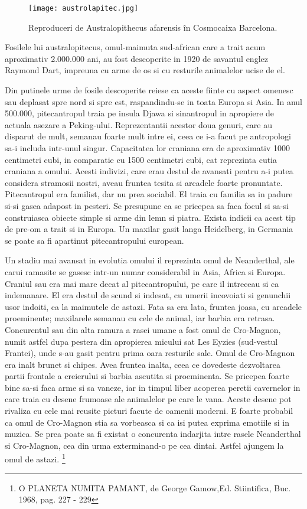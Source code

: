 \begin{wrapfigure}[24]{r}{0.3\linewidth} 
    \texttt{[image: austrolapitec.jpg]}
    \caption{Reproduceri de Australopithecus afarensis în Cosmocaixa Barcelona.}
    \label{fig:pca}
\end{wrapfigure}
Fosilele lui australopitecus, omul-maimuta sud-african care a trait acum aproximativ 2.000.000 ani, au fost descoperite in 1920 de savantul englez Raymond Dart, impreuna cu arme de os si cu resturile animalelor ucise de el.

Din putinele urme de fosile descoperite reiese ca aceste fiinte cu aspect omenesc sau deplasat spre nord si spre est, raspandindu-se in toata Europa si Asia. In anul 500.000, pitecantropul traia pe insula Djawa si sinantropul in apropiere de actuala asezare a Peking-ului. Reprezentantii acestor doua genuri, care au disparut de mult, semanau foarte mult intre ei, ceea ce i-a facut pe antropologi sa-i includa intr-unul singur. Capacitatea lor craniana era de aproximativ 1000 centimetri cubi, in comparatie cu 1500 centimetri cubi, cat reprezinta cutia craniana a omului. Acesti indivizi, care erau destul de avansati pentru a-i putea considera stramosii nostri, aveau fruntea tesita si arcadele foarte pronuntate. Pitecantropul era familist, dar nu prea sociabil. El traia cu familia sa in padure si-si gasea adapost in pesteri. Se presupune ca se pricepea sa faca focul si sa-si construiasca obiecte simple si arme din lemn si piatra. Exista indicii ca acest tip de pre-om a trait si in Europa. Un maxilar gasit langa Heidelberg, in Germania se poate sa fi apartinut pitecantropului european.

Un stadiu mai avansat in evolutia omului il reprezinta omul de Neanderthal, ale carui ramasite se gasesc intr-un numar considerabil in Asia, Africa si Europa. Craniul sau era mai mare decat al pitecantropului, pe care il intreceau si ca indemanare. El era destul de scund si indesat, cu umerii incovoiati si genunchii usor indoiti, ca la maimutele de astazi. Fata sa era lata, fruntea joasa, cu arcadele proeminente; maxilarele semanau cu cele de animal, iar barbia era retrasa. Concurentul sau din alta ramura a rasei umane a fost omul de Cro-Magnon, numit astfel dupa pestera din apropierea micului sat Les Eyzies (sud-vestul Frantei), unde s-au gasit pentru prima oara resturile sale. Omul de Cro-Magnon era inalt brunet si chipes. Avea fruntea inalta, ceea ce dovedeste dezvoltarea partii frontale a creierului si barbia ascutita si proeminenta. Se pricepea foarte bine sa-si faca arme si sa vaneze, iar in timpul liber acoperea peretii cavernelor in care traia cu desene frumoase ale animalelor pe care le vana. Aceste desene pot rivaliza cu cele mai reusite picturi facute de oamenii moderni. E foarte probabil ca omul de Cro-Magnon stia sa vorbeasca si ca isi putea exprima emotiile si in muzica. Se prea poate sa fi existat o concurenta indarjita intre rasele Neanderthal si Cro-Magnon, cea din urma exterminand-o pe cea dintai. Astfel ajungem la omul de astazi. \footnote{O PLANETA NUMITA PAMANT, de George Gamow,Ed. Stiintifica, Buc. 1968, pag. 227 - 229} 

